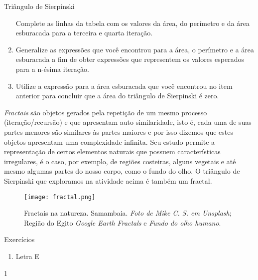 \begin{task}{Triângulo de Sierpinski}
\begin{enumerate}
Complete as linhas da tabela com os valores da área, do perímetro e da área esburacada para a terceira e quarta iteração.

\item{}
Generalize as expressões que você encontrou para a área, o perímetro e a área esburacada a fim de obter expressões que representem os valores esperados para a n-ésima iteração.

\item{}
Utilize a expressão para a área esburacada que você encontrou no item anterior para concluir que a área do triângulo de Sierpinski é zero.

\end{enumerate}

\end{task}

\begin{knowledge}

\textit{Fractais} são objetos gerados pela repetição de um mesmo processo (iteração/recursão) e que apresentam auto similaridade, isto é, cada uma de suas partes menores são similares às partes maiores e por isso dizemos que estes objetos apresentam uma complexidade infinita. Seu estudo permite a representação de certos elementos naturais que possuem características irregulares, é o caso, por exemplo, de regiões costeiras, alguns vegetais e até mesmo algumas partes do nosso corpo, como o fundo do olho. O triângulo de Sierpinski que exploramos na atividade acima é também um fractal.


\begin{figure}[H]
	\centering
	\texttt{[image: fractal.png]}
	\caption{Fractais na natureza. Samambaia.
\textit{Foto de Mike C. S. em Unsplash}; Região do Egito \textit{Google Earth Fractals} e \textit{Fundo do olho humano}.
}
\end{figure}

\end{knowledge}
\clearpage
\def\currentcolor{cor1}
\marginpar{\vspace{.5em}}
\begin{answer}{Exercícios}
{\exerciselist
	\begin{enumerate}
	\item Letra E
	\end{enumerate}
}{1}
\end{answer}
